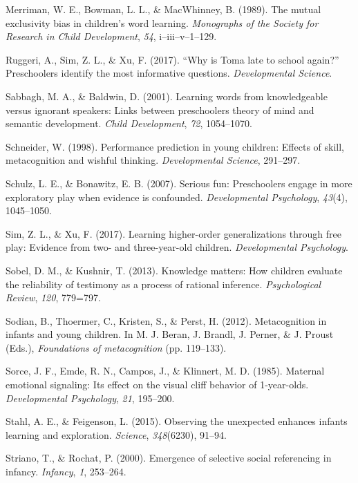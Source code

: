 \documentclass[a4paper,man,apacite,floatsintext]{apa6}
\begin{document}
\hypertarget{ref-Merriman1989}{}
Merriman, W. E., Bowman, L. L., \& MacWhinney, B. (1989). The mutual
exclusivity bias in children's word learning. \emph{Monographs of the
Society for Research in Child Development}, \emph{54},
i--iii--v--1--129.

\hypertarget{ref-Ruggeri2017}{}
Ruggeri, A., Sim, Z. L., \& Xu, F. (2017). ``Why is Toma late to school
again?'' Preschoolers identify the most informative questions.
\emph{Developmental Science}.

\hypertarget{ref-Sabbagh2001}{}
Sabbagh, M. A., \& Baldwin, D. (2001). Learning words from knowledgeable
versus ignorant speakers: Links between preschoolers theory of mind and
semantic development. \emph{Child Development}, \emph{72}, 1054--1070.

\hypertarget{ref-Schneider1998}{}
Schneider, W. (1998). Performance prediction in young children: Effects
of skill, metacognition and wishful thinking. \emph{Developmental
Science}, 291--297.

\hypertarget{ref-Schulz2007}{}
Schulz, L. E., \& Bonawitz, E. B. (2007). Serious fun: Preschoolers
engage in more exploratory play when evidence is confounded.
\emph{Developmental Psychology}, \emph{43}(4), 1045--1050.

\hypertarget{ref-Sim2017}{}
Sim, Z. L., \& Xu, F. (2017). Learning higher-order generalizations
through free play: Evidence from two- and three-year-old children.
\emph{Developmental Psychology}.

\hypertarget{ref-Sobel2013}{}
Sobel, D. M., \& Kushnir, T. (2013). Knowledge matters: How children
evaluate the reliability of testimony as a process of rational
inference. \emph{Psychological Review}, \emph{120}, 779=797.

\hypertarget{ref-Sodian2012}{}
Sodian, B., Thoermer, C., Kristen, S., \& Perst, H. (2012).
Metacognition in infants and young children. In M. J. Beran, J. Brandl,
J. Perner, \& J. Proust (Eds.), \emph{Foundations of metacognition} (pp.
119--133).

\hypertarget{ref-Sorce1985}{}
Sorce, J. F., Emde, R. N., Campos, J., \& Klinnert, M. D. (1985).
Maternal emotional signaling: Its effect on the visual cliff behavior of
1-year-olds. \emph{Developmental Psychology}, \emph{21}, 195--200.

\hypertarget{ref-Stahl2015}{}
Stahl, A. E., \& Feigenson, L. (2015). Observing the unexpected enhances
infants learning and exploration. \emph{Science}, \emph{348}(6230),
91--94.

\hypertarget{ref-Striano2000}{}
Striano, T., \& Rochat, P. (2000). Emergence of selective social
referencing in infancy. \emph{Infancy}, \emph{1}, 253--264.
\end{document}
